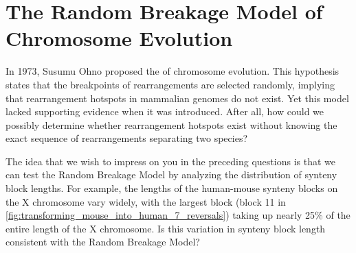\FloatBarrier
\section{The Random Breakage Model of Chromosome Evolution}
\label{sec:the_random_breakage_model_of_chromosome_evolution}

In 1973, Susumu Ohno proposed the  of chromosome evolution.  This hypothesis states that the breakpoints of rearrangements are selected randomly, implying that rearrangement hotspots in mammalian genomes do not exist.  Yet this model lacked supporting evidence when it was introduced.  After all, how could we possibly determine whether rearrangement hotspots exist without knowing the exact sequence of rearrangements separating two species?\\

\begin{qbox}\end{qbox}

\noindent The idea that we wish to impress on you in the preceding questions is that we can test the Random Breakage Model by analyzing the distribution of synteny block lengths. For example, the lengths of the human-mouse synteny blocks on the X chromosome vary widely, with the largest block (block 11 in \autoref{fig:transforming_mouse_into_human_7_reversals}) taking up nearly 25\% of the entire length of the X chromosome. Is this variation in synteny block length consistent with the Random Breakage Model?\\


